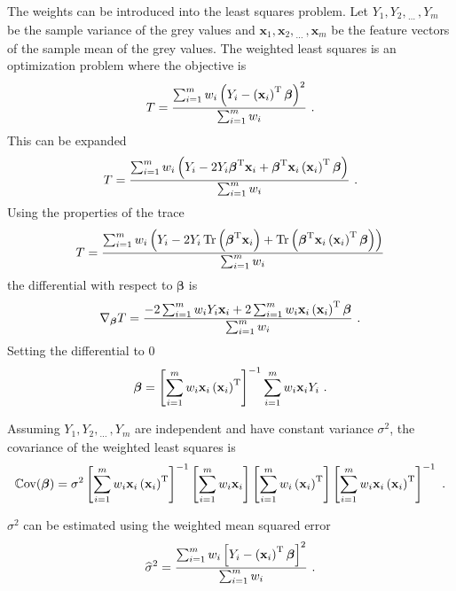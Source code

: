 \documentclass[12pt]{report}
\DeclareMathOperator{\cov}{\mathbb{C}ov}
\DeclareMathOperator{\trace}{Tr}
\newcommand{\T}{^\textup{T}}
\newcommand{\dotdotdot}{_{\phantom{.}\cdots}}
\newcommand{\vect}[1]{\mathbf{#1}}
\newcommand{\vectGreek}[1]{\boldsymbol{#1}}
\begin{document}
The weights can be introduced into the least squares problem.  Let $Y_1,Y_2,\dotdotdot,Y_m$ be the sample variance of the grey values and $\vect{x}_1,\vect{x}_2,\dotdotdot,\vect{x}_m$ be the feature vectors of the sample mean of the grey values. The weighted least squares is an optimization problem where the objective is
\begin{equation}
T =
\frac{\sum_{i=1}^mw_i\left(Y_i-\left(\vect{x}_i\right)\T\vectGreek{\beta}\right)^2}
{\sum_{i=1}^mw_i} \ .
\end{equation}
This can be expanded
\begin{equation}
T =
\frac{\sum_{i=1}^mw_i\left(Y_i-2Y_i\vectGreek{\beta}\T\vect{x}_i+\vectGreek{\beta}\T\vect{x}_i\left(\vect{x}_i\right)\T\vectGreek{\beta}\right)}
{\sum_{i=1}^mw_i} \ .
\end{equation}
Using the properties of the trace
\begin{equation}
T =
\frac{\sum_{i=1}^mw_i\left(Y_i-2Y_i\trace\left(\vectGreek{\beta}\T\vect{x}_i\right)+\trace\left(\vectGreek{\beta}\T\vect{x}_i\left(\vect{x}_i\right)\T\vectGreek{\beta}\right)\right)}
{\sum_{i=1}^mw_i}
\end{equation}
the differential with respect to $\vectGreek{\beta}$ is
\begin{equation}
\nabla_{\vectGreek{\beta}}T = \frac{-2\sum_{i=1}^mw_iY_i\vect{x}_i+2\sum_{i=1}^mw_i\vect{x}_i\left(\vect{x}_i\right)\T\vectGreek{\beta}}{\sum_{i=1}^mw_i} \ .
\end{equation}
Setting the differential to 0
\begin{equation}
\vectGreek{\beta}=\left[\sum_{i=1}^mw_i\vect{x}_i\left(\vect{x}_i\right)\T\right]^{-1}\sum_{i=1}^mw_i\vect{x}_iY_i \ .
\end{equation}

Assuming $Y_1,Y_2,\dotdotdot,Y_m$ are independent and have constant variance $\sigma^2$, the covariance of the weighted least squares is
\begin{equation}
\cov(\vectGreek{\beta})=
\sigma^2\left[\sum_{i=1}^mw_i\vect{x}_i\left(\vect{x}_i\right)\T\right]^{-1}\left[\sum_{i=1}^mw_i\vect{x}_i\right]\left[\sum_{i=1}^mw_i\left(\vect{x}_i\right)\T\right]\left[\sum_{i=1}^mw_i\vect{x}_i\left(\vect{x}_i\right)\T\right]^{-1} \ .
\end{equation}

$\sigma^2$ can be estimated using the weighted mean squared error
\begin{equation}
\widehat{\sigma}^2=\frac{\sum_{i=1}^mw_i\left[Y_i-\left(\vect{x}_i\right)\T\vectGreek{\beta}\right]^2}{\sum_{i=1}^mw_i} \ .
\end{equation}
\end{document}
